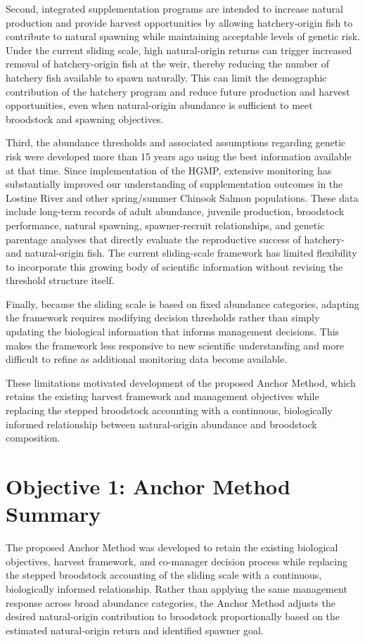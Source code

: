 \documentclass[12pt,letterpaper]{article}
\begin{document}
Second, integrated supplementation programs are intended to increase natural production and provide harvest opportunities by allowing hatchery-origin fish to contribute to natural spawning while maintaining acceptable levels of genetic risk. Under the current sliding scale, high natural-origin returns can trigger increased removal of hatchery-origin fish at the weir, thereby reducing the number of hatchery fish available to spawn naturally. This can limit the demographic contribution of the hatchery program and reduce future production and harvest opportunities, even when natural-origin abundance is sufficient to meet broodstock and spawning objectives.

Third, the abundance thresholds and associated assumptions regarding genetic risk were developed more than 15 years ago using the best information available at that time. Since implementation of the HGMP, extensive monitoring has substantially improved our understanding of supplementation outcomes in the Lostine River and other spring/summer Chinook Salmon populations. These data include long-term records of adult abundance, juvenile production, broodstock performance, natural spawning, spawner-recruit relationships, and genetic parentage analyses that directly evaluate the reproductive success of hatchery- and natural-origin fish. The current sliding-scale framework has limited flexibility to incorporate this growing body of scientific information without revising the threshold structure itself.

Finally, because the sliding scale is based on fixed abundance categories, adapting the framework requires modifying decision thresholds rather than simply updating the biological information that informs management decisions. This makes the framework less responsive to new scientific understanding and more difficult to refine as additional monitoring data become available.

These limitations motivated development of the proposed Anchor Method, which retains the existing harvest framework and management objectives while replacing the stepped broodstock accounting with a continuous, biologically informed relationship between natural-origin abundance and broodstock composition.

\section{Objective 1: Anchor Method Summary}\label{sec:obj1}

The proposed Anchor Method was developed to retain the existing biological objectives, harvest framework, and co-manager decision process while replacing the stepped broodstock accounting of the sliding scale with a continuous, biologically informed relationship. Rather than applying the same management response across broad abundance categories, the Anchor Method adjusts the desired natural-origin contribution to broodstock proportionally based on the estimated natural-origin return and identified spawner goal.
\end{document}
